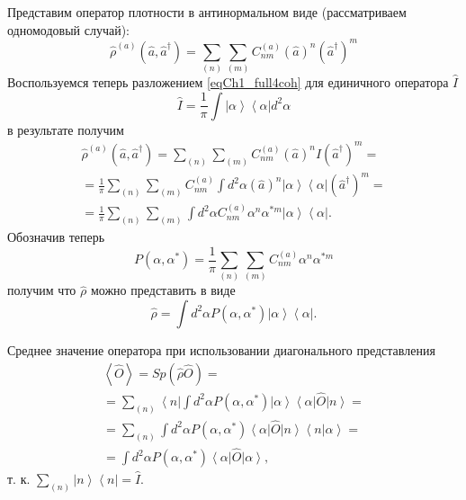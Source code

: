 Представим оператор плотности в
антинормальном виде (рассматриваем одномодовый случай): 
\begin{equation}
\hat{\rho}^{\left(a\right)}\left(\hat{a},\hat{a}^{\dag}\right) = 
\sum_{(n)}\sum_{(m)}C^{\left(a\right)}_{nm}\left(\hat{a}\right)^n\left(\hat{a}^{\dag}\right)^m
\end{equation}
Воспользуемся теперь разложением \eqref{eqCh1_full4coh} для единичного
оператора $\hat{I}$
\[
\hat{I} = \frac{1}{\pi}\int \left|\alpha\right>\left<\alpha\right| d^2 \alpha
\]
в результате получим
\begin{eqnarray}
\hat{\rho}^{\left(a\right)}\left(\hat{a},\hat{a}^{\dag}\right) = 
\sum_{(n)}\sum_{(m)}C^{\left(a\right)}_{nm}\left(\hat{a}\right)^n\hat{I}\left(\hat{a}^{\dag}\right)^m
= 
\nonumber \\
= \frac{1}{\pi}\sum_{(n)}\sum_{(m)}C^{\left(a\right)}_{nm}\int d^2 \alpha
\left(\hat{a}\right)^n
\left|\alpha\right>\left<\alpha\right|
\left(\hat{a}^{\dag}\right)^m = 
\nonumber \\
= \frac{1}{\pi}\sum_{(n)}\sum_{(m)}\int d^2 \alpha
C^{\left(a\right)}_{nm}
\alpha^n
\alpha^{*m}
\left|\alpha\right>\left<\alpha\right|.
\end{eqnarray}
Обозначив теперь 
\[
P\left(\alpha, \alpha^{*}\right) = \frac{1}{\pi}\sum_{(n)}\sum_{(m)}
C^{\left(a\right)}_{nm}
\alpha^n
\alpha^{*m}
\]
получим что $\hat{\rho}$ можно представить в виде
\begin{equation}
\hat{\rho} = \int d^2 \alpha P\left(\alpha, \alpha^{*}\right) 
\left|\alpha\right>\left<\alpha\right|.
\label{eqCh1_Rho_in_alpha}
\end{equation}

Среднее значение оператора при использовании
диагонального представления 
\begin{eqnarray}
\left<\hat{O}\right> = Sp \left(\hat{\rho}\hat{O}\right) =
\nonumber \\
= \sum_{(n)}\left<n\right|
\int d^2 \alpha P\left(\alpha, \alpha^{*}\right) 
\left|\alpha\right>\left<\alpha\right|
\hat{O}\left|n\right> =
\nonumber \\
= \sum_{(n)} \int d^2 \alpha P\left(\alpha, \alpha^{*}\right)
\left<\alpha\right|\hat{O}\left|n\right>
\left<n\right|\left.\alpha\right> = 
\nonumber \\
=  
\int d^2 \alpha P\left(\alpha, \alpha^{*}\right)
\left<\alpha\right|\hat{O}\left|\alpha\right>,
\label{eqCh1_middleO}
\end{eqnarray}
т. к. $\sum_{(n)}\left|n\right>\left<n\right| = \hat{I}$. 

